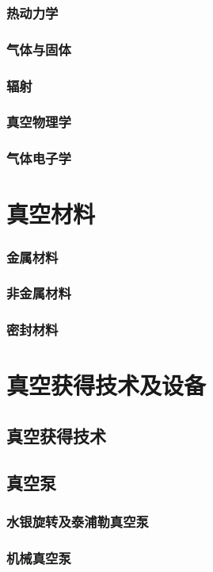 \documentclass[UTF8]{../../ApplicationUniverse}
\begin{document}
    \subsubsection{热动力学}
    \subsubsection{气体与固体}
    \subsubsection{辐射}
    \subsubsection{真空物理学}
    \subsubsection{气体电子学}
\section{真空材料}
    \subsubsection{金属材料}
    \subsubsection{非金属材料}
    \subsubsection{密封材料}
\section{真空获得技术及设备}
    \subsection{真空获得技术}
    \subsection{真空泵}
        \subsubsection{水银旋转及泰浦勒真空泵}
        \subsubsection{机械真空泵}
\end{document}
